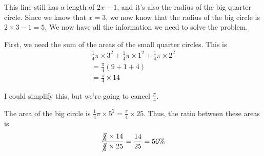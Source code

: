 \documentclass[a4paper]{article}
\newcommand{\qpi}{\frac{1}{4}\pi}
\newcommand{\pif}{\frac{\pi}{4}}
\begin{document}
This line still has a length of $2x - 1$, and it's also the radius of the big quarter circle. Since we know that $x = 3$, we now know that the radius of the big circle is $2 \times 3 - 1 = 5$. We now have all the information we need to solve the problem.

\hspace{\fill}
\hspace{\fill}

First, we need the sum of the areas of the small quarter circles. This is
\begin{gather*}
\qpi \times 3^2 + \qpi \times 1^2 + \qpi \times 2^2\\
= \pif (9 + 1 + 4)\\
= \pif \times 14
\end{gather*}

I could simplify this, but we're going to cancel $\pif$.

The area of the big circle is $\qpi \times 5^2 = \pif \times 25$. Thus, the ratio between these areas is $$\frac{\cancel{\pif} \times 14}{\cancel{\pif} \times 25} = \frac{14}{25} = 56\%$$
\end{document}
